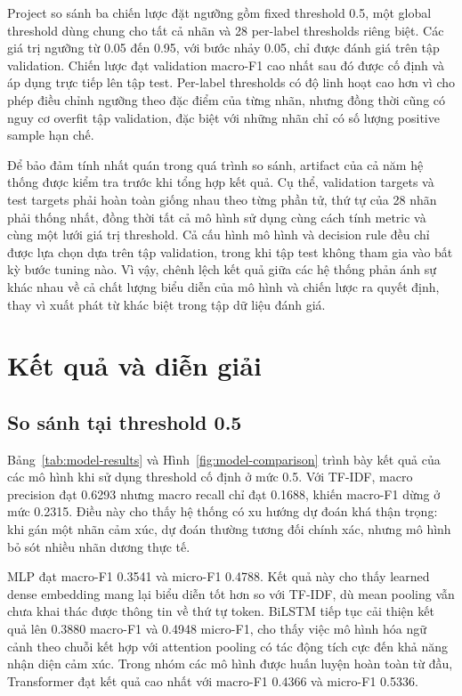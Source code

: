\documentclass[12pt,a4paper]{article}
\begin{document}
Project so sánh ba chiến lược đặt ngưỡng gồm fixed threshold 0.5, một global threshold dùng chung cho tất cả nhãn và 28 per-label thresholds riêng biệt. Các giá trị ngưỡng từ 0.05 đến 0.95, với bước nhảy 0.05, chỉ được đánh giá trên tập validation. Chiến lược đạt validation macro-F1 cao nhất sau đó được cố định và áp dụng trực tiếp lên tập test. Per-label thresholds có độ linh hoạt cao hơn vì cho phép điều chỉnh ngưỡng theo đặc điểm của từng nhãn, nhưng đồng thời cũng có nguy cơ overfit tập validation, đặc biệt với những nhãn chỉ có số lượng positive sample hạn chế.

Để bảo đảm tính nhất quán trong quá trình so sánh, artifact của cả năm hệ thống được kiểm tra trước khi tổng hợp kết quả. Cụ thể, validation targets và test targets phải hoàn toàn giống nhau theo từng phần tử, thứ tự của 28 nhãn phải thống nhất, đồng thời tất cả mô hình sử dụng cùng cách tính metric và cùng một lưới giá trị threshold. Cả cấu hình mô hình và decision rule đều chỉ được lựa chọn dựa trên tập validation, trong khi tập test không tham gia vào bất kỳ bước tuning nào. Vì vậy, chênh lệch kết quả giữa các hệ thống phản ánh sự khác nhau về cả chất lượng biểu diễn của mô hình và chiến lược ra quyết định, thay vì xuất phát từ khác biệt trong tập dữ liệu đánh giá.


\section{Kết quả và diễn giải}
\subsection{So sánh tại threshold 0.5}



Bảng~\ref{tab:model-results} và Hình~\ref{fig:model-comparison} trình bày kết quả của các mô hình khi sử dụng threshold cố định ở mức 0.5. Với TF-IDF, macro precision đạt 0.6293 nhưng macro recall chỉ đạt 0.1688, khiến macro-F1 dừng ở mức 0.2315. Điều này cho thấy hệ thống có xu hướng dự đoán khá thận trọng: khi gán một nhãn cảm xúc, dự đoán thường tương đối chính xác, nhưng mô hình bỏ sót nhiều nhãn dương thực tế.

MLP đạt macro-F1 0.3541 và micro-F1 0.4788. Kết quả này cho thấy learned dense embedding mang lại biểu diễn tốt hơn so với TF-IDF, dù mean pooling vẫn chưa khai thác được thông tin về thứ tự token. BiLSTM tiếp tục cải thiện kết quả lên 0.3880 macro-F1 và 0.4948 micro-F1, cho thấy việc mô hình hóa ngữ cảnh theo chuỗi kết hợp với attention pooling có tác động tích cực đến khả năng nhận diện cảm xúc. Trong nhóm các mô hình được huấn luyện hoàn toàn từ đầu, Transformer đạt kết quả cao nhất với macro-F1 0.4366 và micro-F1 0.5336.
\end{document}
